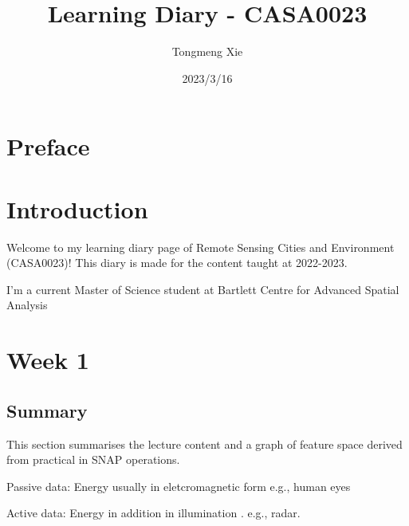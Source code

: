 \documentclass[
  letterpaper,
  DIV=11,
  numbers=noendperiod]{scrreprt}
\title{Learning Diary - CASA0023}
\author{Tongmeng Xie}
\date{2023/3/16}
\renewcommand*\contentsname{Table of contents}
\newcommand\contentsname{Table of contents}
\begin{document}
\maketitle
\ifdefined\Shaded\renewenvironment{Shaded}{\begin{tcolorbox}[boxrule=0pt, borderline west={3pt}{0pt}{shadecolor}, breakable, enhanced, interior hidden, sharp corners, frame hidden]}{\end{tcolorbox}}\fi

\renewcommand*\contentsname{Table of contents}
{
\hypersetup{linkcolor=}
\setcounter{tocdepth}{2}
\tableofcontents
}

\hypertarget{preface}{%
\chapter*{Preface}\label{preface}}


\hypertarget{introduction}{%
\chapter*{Introduction}\label{introduction}}

Welcome to my learning diary page of Remote Sensing Cities and
Environment (CASA0023)! This diary is made for the content taught at
2022-2023.

I'm a current Master of Science student at Bartlett Centre for Advanced
Spatial Analysis


\hypertarget{week-1}{%
\chapter{Week 1}\label{week-1}}

\hypertarget{summary}{%
\section{Summary}\label{summary}}

This section summarises the lecture content and a graph of feature space
derived from practical in SNAP operations.

Passive data: Energy usually in eletcromagnetic form e.g., human eyes

Active data: Energy in addition in illumination . e.g., radar.
\end{document}
